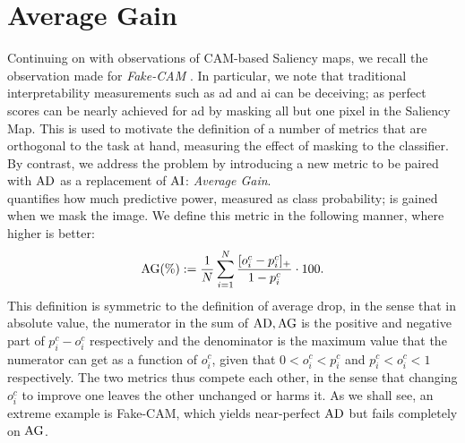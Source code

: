 \section{Average Gain}
\label{sec:av_gain}
Continuing on with observations of CAM-based Saliency maps, we recall the observation made for 
\emph{Fake-CAM} \cite{poppi2021revisiting}. In particular, we note that traditional 
interpretability measurements such as \gls{ad} and \gls{ai} can be deceiving; as perfect scores can 
be nearly achieved for \gls{ad} by masking all but one pixel in the Saliency Map. This is used to 
motivate the definition of a number of metrics that are orthogonal to the task at hand, \ie 
measuring the effect of masking to the classifier. By contrast, we address the problem by 
introducing a new metric to be paired with $\operatorname{AD}$ as a replacement of $\operatorname{AI}$: 
\emph{Average Gain}.\\

\noindent \emph{} quantifies how much predictive power, measured as class probability; 
is gained when we mask the image. We define this metric in the following manner, where higher is 
better:
\begin{equation}
	\operatorname{AG}(\%) \mathrel{:=} \frac{1}{N} \sum_{i=1}^N \frac{[o^c_i - p^c_i]_+}{1-p^c_i} \cdot 100.
\label{eq:ag}
\end{equation}
This definition is symmetric to the definition of average drop, in the sense that in absolute value,
the numerator in the sum of $\operatorname{AD}, \operatorname{AG}$ is the positive and negative part of $p^c_i - o^c_i$ 
respectively and the denominator is the maximum value that the numerator can get as a function of 
$o^c_i$, given that $0 < o^c_i < p^c_i$ and $p^c_i < o^c_i < 1$ respectively. The two metrics thus  
compete each other, in the sense that changing $o^c_i$ to improve one leaves the other unchanged or  
harms it. As we shall see, an extreme example is Fake-CAM, which yields near-perfect $\operatorname{AD}$ but 
fails completely on $\operatorname{AG}$.

